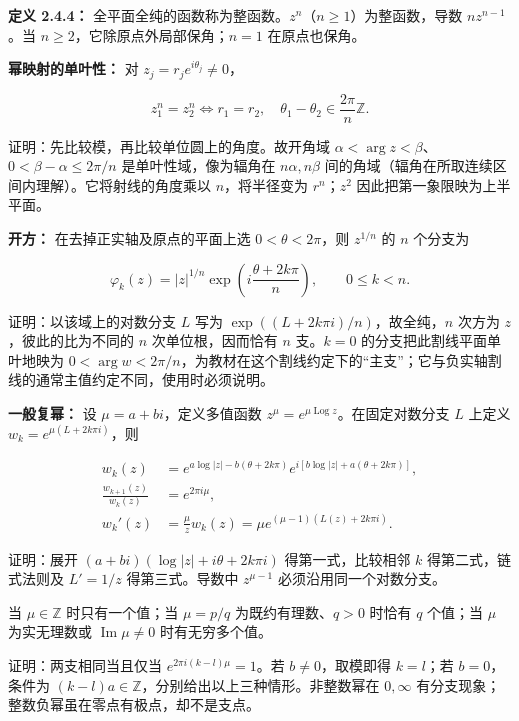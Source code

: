 \documentclass[11pt,a4paper]{article}
\begin{document}
\textbf{定义 2.4.4：}
全平面全纯的函数称为整函数。\(z^n\)（\(n\ge1\)）为整函数，导数
\(nz^{n-1}\)。当 \(n\ge2\)，它除原点外局部保角；\(n=1\) 在原点也保角。

\textbf{幂映射的单叶性：} 对 \(z_j=r_je^{i\theta_j}\ne0\)，

\[
z_1^n=z_2^n\iff r_1=r_2,\quad\theta_1-\theta_2\in\frac{2\pi}{n}\mathbb Z.
\]

证明：先比较模，再比较单位圆上的角度。故开角域
\(\alpha<\arg z<\beta\)、\(0<\beta-\alpha\le2\pi/n\)
是单叶性域，像为辐角在 \(n\alpha,n\beta\)
间的角域（辐角在所取连续区间内理解）。它将射线的角度乘以
\(n\)，将半径变为 \(r^n\)；\(z^2\) 因此把第一象限映为上半平面。

\textbf{开方：} 在去掉正实轴及原点的平面上选 \(0<\theta<2\pi\)，则
\(z^{1/n}\) 的 \(n\) 个分支为

\[
\varphi_k(z)=|z|^{1/n}\exp\!\left(i\frac{\theta+2k\pi}{n}\right),\qquad 0\le k<n.
\]

证明：以该域上的对数分支 \(L\) 写为
\(\exp((L+2k\pi i)/n)\)，故全纯，\(n\) 次方为 \(z\)，彼此的比为不同的
\(n\) 次单位根，因而恰有 \(n\) 支。\(k=0\) 的分支把此割线平面单叶地映为
\(0<\arg w<2\pi/n\)，为教材在这个割线约定下的``主支''；它与负实轴割线的通常主值约定不同，使用时必须说明。

\textbf{一般复幂：} 设 \(\mu=a+bi\)，定义多值函数
\(z^\mu=e^{\mu\operatorname{Log}z}\)。在固定对数分支 \(L\) 上定义
\(w_k=e^{\mu(L+2k\pi i)}\)，则

\[
\begin{aligned}
w_k(z)&=e^{a\log|z|-b(\theta+2k\pi)}
 e^{i[b\log|z|+a(\theta+2k\pi)]},\\
\frac{w_{k+1}(z)}{w_k(z)}&=e^{2\pi i\mu},\\
w_k'(z)&=\frac{\mu}{z}w_k(z)=\mu e^{(\mu-1)(L(z)+2k\pi i)}.
\end{aligned}
\]

证明：展开 \((a+bi)(\log|z|+i\theta+2k\pi i)\) 得第一式，比较相邻 \(k\)
得第二式，链式法则及 \(L'=1/z\) 得第三式。导数中 \(z^{\mu-1}\)
必须沿用同一个对数分支。

当 \(\mu\in\mathbb Z\) 时只有一个值；当 \(\mu=p/q\)
为既约有理数、\(q>0\) 时恰有 \(q\) 个值；当 \(\mu\) 为实无理数或
\(\operatorname{Im}\mu\ne0\) 时有无穷多个值。

证明：两支相同当且仅当 \(e^{2\pi i(k-l)\mu}=1\)。若 \(b\ne0\)，取模即得
\(k=l\)；若 \(b=0\)，条件为
\((k-l)a\in\mathbb Z\)，分别给出以上三种情形。非整数幂在 \(0,\infty\)
有分支现象；整数负幂虽在零点有极点，却不是支点。

\end{document}
